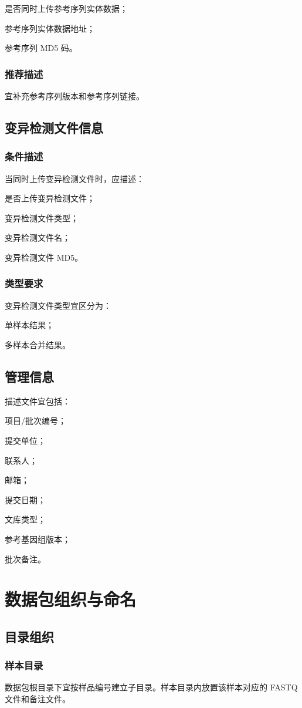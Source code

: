 是否同时上传参考序列实体数据；

参考序列实体数据地址；

参考序列 MD5 码。

\subsection{推荐描述}
宜补充参考序列版本和参考序列链接。

\section{变异检测文件信息}
\subsection{条件描述}
当同时上传变异检测文件时，应描述：

是否上传变异检测文件；

变异检测文件类型；

变异检测文件名；

变异检测文件 MD5。

\subsection{类型要求}
变异检测文件类型宜区分为：

单样本结果；

多样本合并结果。

\section{管理信息}
描述文件宜包括：

项目/批次编号；

提交单位；

联系人；

邮箱；

提交日期；

文库类型；

参考基因组版本；

批次备注。

\chapter{数据包组织与命名}
\section{目录组织}
\subsection{样本目录}
数据包根目录下宜按样品编号建立子目录。样本目录内放置该样本对应的 FASTQ 文件和备注文件。

